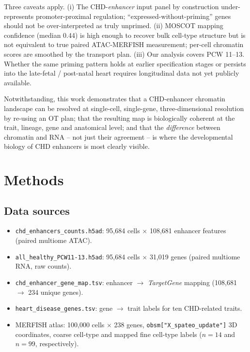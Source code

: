 \documentclass[11pt,a4paper]{article}
\begin{document}
Three caveats apply. (i) The CHD-\emph{enhancer} input panel by construction
under-represents promoter-proximal regulation; ``expressed-without-priming''
genes should not be over-interpreted as truly unprimed. (ii) MOSCOT mapping
confidence (median 0.44) is high enough to recover bulk cell-type structure
but is not equivalent to true paired ATAC-MERFISH measurement; per-cell
chromatin scores are smoothed by the transport plan. (iii) Our analysis
covers PCW 11--13. Whether the same priming pattern holds at earlier
specification stages or persists into the late-fetal / post-natal heart
\citep{litvinukova2020adultheart} requires longitudinal data not yet
publicly available.

Notwithstanding, this work demonstrates that a CHD-enhancer chromatin
landscape can be resolved at single-cell, single-gene, three-dimensional
resolution by re-using an OT plan; that the resulting map is biologically
coherent at the trait, lineage, gene and anatomical level; and that the
\emph{difference} between chromatin and RNA -- not just their agreement -- is
where the developmental biology of CHD enhancers is most clearly visible.

\section{Methods}

\subsection{Data sources}
\begin{itemize}[leftmargin=1.2em,topsep=0pt,itemsep=2pt]
\item \texttt{chd\_enhancers\_counts.h5ad}: 95{,}684 cells \(\times\) 108{,}681
      enhancer features (paired multiome ATAC).
\item \texttt{all\_healthy\_PCW11-13.h5ad}: 95{,}684 cells \(\times\) 31{,}019
      genes (paired multiome RNA, raw counts).
\item \texttt{chd\_enhancer\_gene\_map.tsv}: enhancer \(\rightarrow\)
      \emph{TargetGene} mapping (108{,}681 \(\rightarrow\) 234 unique genes).
\item \texttt{heart\_disease\_genes.tsv}: gene \(\rightarrow\) trait labels for
      ten CHD-related traits.
\item MERFISH atlas: 100{,}000 cells \(\times\) 238 genes,
      \texttt{obsm["X\_spateo\_update"]} 3D coordinates, coarse cell-type and
      mapped fine cell-type labels (\(n=14\) and \(n=99\), respectively).
\end{itemize}
\end{document}
